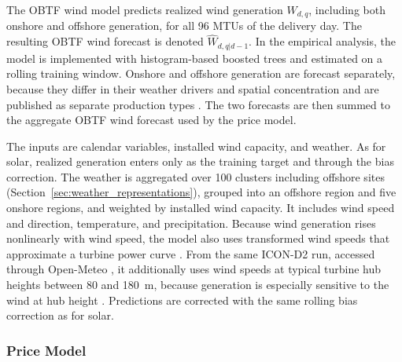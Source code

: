 The OBTF wind model predicts realized wind generation \(W_{d,q}\), including both
onshore and offshore generation, for all 96 MTUs of the delivery day. The
resulting OBTF wind forecast is denoted \(\hat{W}_{d,q|d-1}\). In the
empirical analysis, the model is implemented with histogram-based boosted
trees and estimated on a rolling training window. Onshore and offshore
generation are forecast separately, because they differ in their weather drivers
and spatial concentration and are published as separate production types
\cite{entsoeTransparency}. The two forecasts are then summed to the aggregate
OBTF wind forecast used by the price model.

The inputs are calendar variables, installed wind capacity, and weather. As for
solar, realized generation enters only as the training target and through the
bias correction. The weather is aggregated over 100 clusters including offshore
sites (Section~\ref{sec:weather_representations}), grouped into an offshore
region and five onshore regions, and weighted by installed wind capacity. It
includes wind speed and direction, temperature, and precipitation. Because wind
generation rises nonlinearly with wind speed, the model also uses transformed
wind speeds that approximate a turbine power curve \cite{bandi2016powerCurve}.
From the same \mbox{ICON-D2} run, accessed through Open-Meteo
\cite{openMeteoForecastApi}, it additionally uses wind speeds at typical turbine
hub heights between 80 and 180~m, because generation is especially sensitive to
the wind at hub height \cite{bandi2016powerCurve,foley2012windForecasting}. Predictions are corrected with the same rolling bias
correction as for solar.

\subsubsection{Price Model}
\label{sec:price_model}
\label{sec:price_features}

